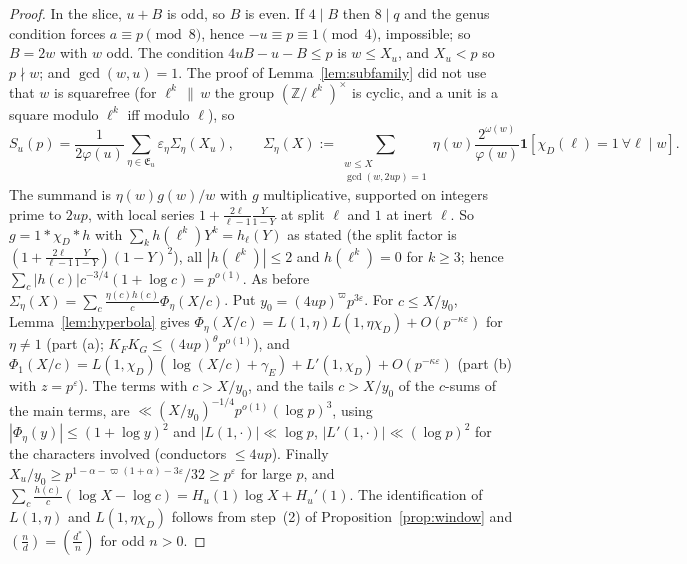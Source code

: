 \documentclass[11pt,reqno]{amsart}
\theoremstyle{definition}
\newcommand{\Z}{\mathbb Z}
\newcommand{\eps}{\varepsilon}
\newcommand{\leg}[2]{\left(\frac{#1}{#2}\right)}
\newcommand{\cE}{\mathfrak E}
\begin{document}
\begin{proof}
In the slice, $u+B$ is odd, so $B$ is even.  If $4\mid B$ then $8\mid q$
and the genus condition forces $a\equiv p\pmod 8$, hence $-u\equiv p\equiv
1\pmod4$, impossible; so $B=2w$ with $w$ odd.  The condition
$4uB-u-B\le p$ is $w\le X_u$, and $X_u<p$ so $p\nmid w$; and
$\gcd(w,u)=1$.  The proof of Lemma~\ref{lem:subfamily} did not use that
$w$ is squarefree (for $\ell^k\,\|\,w$ the group $(\Z/\ell^k)^\times$ is
cyclic, and a unit is a square modulo $\ell^k$ iff modulo $\ell$), so
\[
 S_u(p)=\frac1{2\varphi(u)}\sum_{\eta\in\cE_u}\eps_\eta\Sigma_\eta(X_u),\qquad
 \Sigma_\eta(X):=\sum_{\substack{w\le X\\ \gcd(w,2up)=1}}\eta(w)
 \frac{2^{\omega(w)}}{\varphi(w)}\mathbf 1[\chi_D(\ell)=1\ \forall\ell\mid w].
\]
The summand is $\eta(w)g(w)/w$ with $g$ multiplicative, supported on
integers prime to $2up$, with local series $1+\frac{2\ell}{\ell-1}\frac{Y}{1-Y}$
at split $\ell$ and $1$ at inert $\ell$.  So $g=1*\chi_D*h$ with
$\sum_kh(\ell^k)Y^k=h_\ell(Y)$ as stated (the split factor is
$(1+\frac{2\ell}{\ell-1}\frac Y{1-Y})(1-Y)^2$), all $|h(\ell^k)|\le2$ and
$h(\ell^k)=0$ for $k\ge3$; hence $\sum_c|h(c)|c^{-3/4}(1+\log
c)=p^{o(1)}$.  As before
$\Sigma_\eta(X)=\sum_c\frac{\eta(c)h(c)}c\Phi_\eta(X/c)$.  Put
$y_0=(4up)^\varpi p^{3\eps}$.  For $c\le X/y_0$, Lemma~\ref{lem:hyperbola}
gives $\Phi_\eta(X/c)=L(1,\eta)L(1,\eta\chi_D)+O(p^{-\kappa\eps})$ for
$\eta\ne1$ (part (a); $K_FK_G\le(4up)^\theta p^{o(1)}$), and
$\Phi_1(X/c)=L(1,\chi_D)(\log(X/c)+\gamma_E)+L'(1,\chi_D)+O(p^{-\kappa\eps})$
(part (b) with $z=p^\eps$).  The terms with $c>X/y_0$, and the tails
$c>X/y_0$ of the $c$-sums of the main terms, are
$\ll(X/y_0)^{-1/4}p^{o(1)}(\log p)^3$, using $|\Phi_\eta(y)|\le(1+\log
y)^2$ and $|L(1,\cdot)|\ll\log p$, $|L'(1,\cdot)|\ll(\log p)^2$ for the
characters involved (conductors $\le4up$).  Finally $X_u/y_0\ge
p^{1-\alpha-\varpi(1+\alpha)-3\eps}/32\ge p^{\eps}$ for large $p$, and
$\sum_c\frac{h(c)}c(\log X-\log c)=H_u(1)\log X+H_u'(1)$.  The
identification of $L(1,\eta)$ and $L(1,\eta\chi_D)$ follows from
step~(2) of Proposition~\ref{prop:window} and
$\leg nd=\leg{d^*}n$ for odd $n>0$.
\end{proof}
\end{document}
